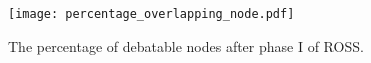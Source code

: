 \documentclass[10pt,journal,compsoc]{IEEEtran}
\makeatletter
\theoremstyle{mytheoremstyle}
\theoremstyle{mytheoremstyle}
\theoremstyle{mytheoremstyle}
\renewenvironment{proof}[1][\proofname]{%
      \par\pushQED{\qed}\fontfamily{ptm}\selectfont%
      \topsep6\p@\@plus6\p@\relax
      \trivlist\item[\hskip\labelsep\bfseries#1\@addpunct{.}]%
      \ignorespaces
    }{%
      \popQED\endtrivlist\@endpefalse
    }
\makeatother
\begin{document}
\begin{figure}[ht!]
  \centering
  \texttt{[image: percentage\_overlapping\_node.pdf]}
  \caption{The percentage of debatable nodes after phase I of ROSS.}\label{percentage_overlapping_node}
\end{figure}





%

\end{document}
